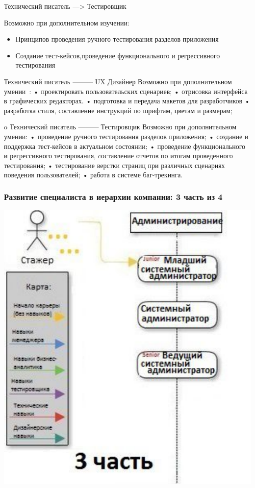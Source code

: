 \documentclass{../industrial-development}
\begin{document}
{\begin{frame}
\begin{block}{Технический писатель ---> Тестировщик}

Возможно при дополнительном изучении:
  \end{block}
\begin{itemize}
  \item Принципов проведения ручного тестирования разделов приложения
  \item Создание тест-кейсов,проведение функционального и регрессивного тестирования
  \end{itemize}
\end{frame}

\lecturenotes
Технический писатель ---------UX Дизайнер
Возможно при дополнительном умении~\cite{rab}:
•	проектировать пользовательских сценариев;
•	отрисовка интерфейса в графических редакторах.
•	подготовка и передача макетов для разработчиков
•	разработка стиля, составление инструкций по шрифтам, цветам и размерам;


o	Технический писатель ---------Тестировщик
Возможно при дополнительном умении:
•	проведение ручного тестирования разделов приложения;
•	создание и поддержка тест-кейсов в актуальном состоянии;
•	проведение функционального и регрессивного тестирования, cоставление отчетов по итогам проведенного тестирования;
•	тестирование верстки страниц при различных сценариях поведения пользователей;
•	работа в системе баг-трекинга.




\begin{frame} \frametitle{Развитие  специалиста в иерархии компании: 3 часть из 4 }
  \centerline{\includegraphics[width=0.62\linewidth]{11-IT-specialist's-way/sch13.pdf}}
\end{frame}


}
\end{document}
